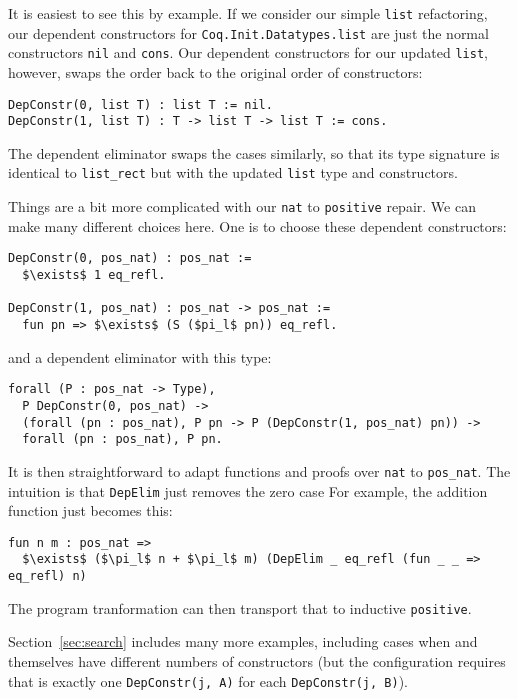 It is easiest to see this by example.
If we consider our simple \lstinline{list} refactoring, our dependent
constructors for \lstinline{Coq.Init.Datatypes.list} are just the normal constructors
\lstinline{nil} and \lstinline{cons}. Our dependent constructors for our updated
\lstinline{list}, however, swaps the order back to the original order of constructors:

\begin{lstlisting}
DepConstr(0, list T) : list T := nil.
DepConstr(1, list T) : T -> list T -> list T := cons.
\end{lstlisting}
The dependent eliminator swaps the cases similarly, so that its type signature is identical
to \lstinline{list_rect} but with the updated \lstinline{list} type and constructors.

Things are a bit more complicated with our \lstinline{nat} to \lstinline{positive} repair.
We can make many different choices here. One is to choose these dependent constructors:

\begin{lstlisting}
DepConstr(0, pos_nat) : pos_nat :=
  $\exists$ 1 eq_refl.

DepConstr(1, pos_nat) : pos_nat -> pos_nat :=
  fun pn => $\exists$ (S ($pi_l$ pn)) eq_refl.
\end{lstlisting} %
and a dependent eliminator with this type:

\begin{lstlisting}
forall (P : pos_nat -> Type),
  P DepConstr(0, pos_nat) ->
  (forall (pn : pos_nat), P pn -> P (DepConstr(1, pos_nat) pn)) ->
  forall (pn : pos_nat), P pn.
\end{lstlisting}
It is then straightforward to adapt functions and proofs over \lstinline{nat} to \lstinline{pos_nat}.
The intuition is that \lstinline{DepElim} just removes the zero case 
For example, the addition function just becomes this:

\begin{lstlisting}
fun n m : pos_nat =>
  $\exists$ ($\pi_l$ n + $\pi_l$ m) (DepElim _ eq_refl (fun _ _ => eq_refl) n)
\end{lstlisting} %
The program tranformation can then transport that to inductive \lstinline{positive}.

Section~\ref{sec:search} includes many more examples, including cases when \A and \B
themselves have different numbers of constructors (but the configuration requires that
is exactly one \lstinline{DepConstr(j, A)} for each \lstinline{DepConstr(j, B)}).

